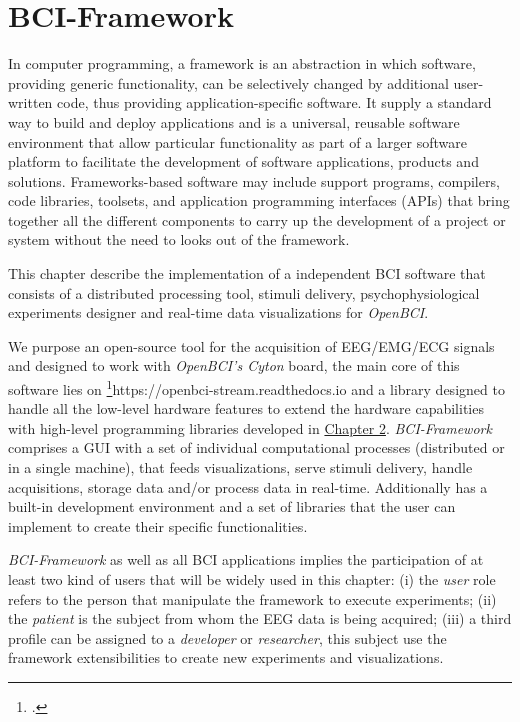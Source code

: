 \chapter{BCI-Framework}\label{ch:chapter_4}

In computer programming, a framework is an abstraction in which software, providing generic functionality, can be selectively changed by additional user-written code, thus providing application-specific software. It supply a standard way to build and deploy applications and is a universal, reusable software environment that allow particular functionality as part of a larger software platform to facilitate the development of software applications, products and solutions. Frameworks-based software may include support programs, compilers, code libraries, toolsets, and application programming interfaces (\gls*{API}s) that bring together all the different components to carry up the development of a project or system \cite{soni2017full} without the need to looks out of the framework.

This chapter describe the implementation of a independent \gls*{BCI} software that consists of a distributed processing tool, stimuli delivery, psychophysiological experiments designer and real-time data visualizations for \textit{OpenBCI}. 

We purpose an open-source tool for the acquisition of EEG/EMG/ECG signals and designed to work with \textit{OpenBCI’s Cyton} board, the main core of this software lies on \footcite{OpenBCI-Stream}{https://openbci-stream.readthedocs.io} and a library designed to handle all the low-level hardware features to extend the hardware capabilities with high-level programming libraries developed in \hyperref[ch:chapter_2]{Chapter 2}. \textit{BCI-Framework} comprises a \gls*{GUI} with a set of individual computational processes (distributed or in a single machine), that feeds visualizations, serve stimuli delivery, handle acquisitions, storage data and/or process data in real-time. Additionally has a built-in development environment and a set of libraries that the user can implement to create their specific functionalities.

\textit{BCI-Framework} as well as all \gls*{BCI} applications implies the participation of at least two kind of users that will be widely used in this chapter: 
(i) the \textit{user} role refers to the person that manipulate the framework to execute experiments;
(ii) the \textit{patient} is the subject from whom the EEG data is being acquired;
(iii) a third profile can be assigned to a \textit{developer} or \textit{researcher}, this subject use the framework extensibilities to create new experiments and visualizations.


